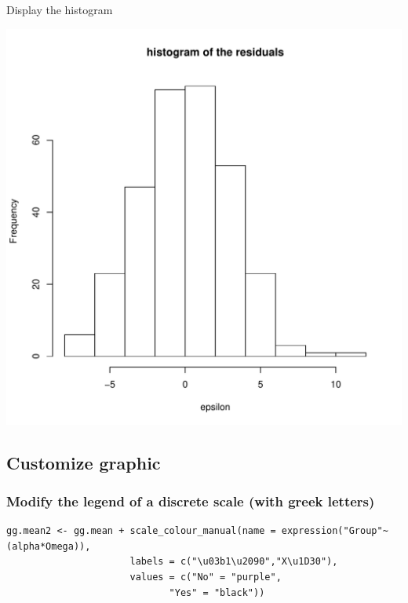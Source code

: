 \documentclass{article}
\begin{document}
Display the histogram
\begin{center}
\includegraphics[width=.9\linewidth]{./figures/fig-hist-residuals.pdf}
\end{center}

\subsection{Customize graphic}
\label{sec:org89867a9}

\subsubsection{Modify the legend of a discrete scale (with greek letters)}
\label{sec:org3d0b50c}

\lstset{language=r,label= ,caption= ,captionpos=b,numbers=none}
\begin{lstlisting}
gg.mean2 <- gg.mean + scale_colour_manual(name = expression("Group"~(alpha*Omega)),
					  labels = c("\u03b1\u2090","X\u1D30"),
					  values = c("No" = "purple", 
						     "Yes" = "black"))
\end{lstlisting}
\end{document}
